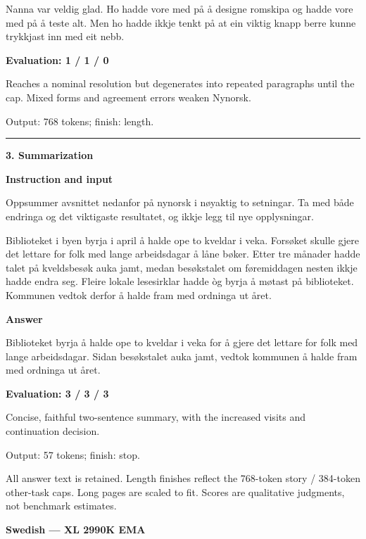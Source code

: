 \documentclass[10pt]{article}
\begin{document}
{\begin{minipage}{\textwidth}
Nanna var veldig glad. Ho hadde vore med på å designe romskipa og hadde vore med på å teste alt. Men ho hadde ikkje tenkt på at ein viktig knapp berre kunne trykkjast inn med eit nebb.\par\smallskip
\textbf{Evaluation: 1 / 1 / 0}\par Reaches a nominal resolution but degenerates into repeated paragraphs until the cap. Mixed forms and agreement errors weaken Nynorsk.
\par {\color{gray} Output: 768 tokens; finish: length.}\par
\medskip\hrule\smallskip
{\bfseries 3. Summarization}\par\smallskip
\textbf{Instruction and input}\par Oppsummer avsnittet nedanfor på nynorsk i nøyaktig to setningar. Ta med både endringa og det viktigaste resultatet, og ikkje legg til nye opplysningar.
\par\smallskip
Biblioteket i byen byrja i april å halde ope to kveldar i veka. Forsøket skulle gjere det lettare for folk med lange arbeidsdagar å låne bøker. Etter tre månader hadde talet på kveldsbesøk auka jamt, medan besøkstalet om føremiddagen nesten ikkje hadde endra seg. Fleire lokale lesesirklar hadde òg byrja å møtast på biblioteket. Kommunen vedtok derfor å halde fram med ordninga ut året.\par\smallskip
\textbf{Answer}\par Biblioteket byrja å halde ope to kveldar i veka for å gjere det lettare for folk med lange arbeidsdagar. Sidan besøkstalet auka jamt, vedtok kommunen å halde fram med ordninga ut året.\par\smallskip
\textbf{Evaluation: 3 / 3 / 3}\par Concise, faithful two-sentence summary, with the increased visits and continuation decision.
\par {\color{gray} Output: 57 tokens; finish: stop.}\par
\medskip\footnotesize All answer text is retained. Length finishes reflect the 768-token story / 384-token other-task caps. Long pages are scaled to fit. Scores are qualitative judgments, not benchmark estimates.
\end{minipage}}%
\noindent\ifdim\dimexpr\ht\languagepage+\dp\languagepage\relax>0.93\textheight%
\resizebox*{!}{0.93\textheight}{\usebox{\languagepage}}%
\else\usebox{\languagepage}\fi%
\clearpage
{\Large\bfseries Swedish --- XL 2990K EMA}\par\smallskip
\end{document}
